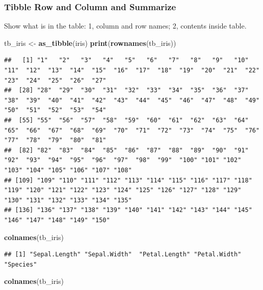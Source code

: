\documentclass[
]{book}
\newenvironment{Shaded}{\begin{snugshade}}{\end{snugshade}}
\newcommand{\KeywordTok}[1]{\textcolor[rgb]{0.13,0.29,0.53}{\textbf{#1}}}
\newcommand{\NormalTok}[1]{#1}
\newcommand{\StringTok}[1]{\textcolor[rgb]{0.31,0.60,0.02}{#1}}
\begin{document}
\hypertarget{tibble-row-and-column-and-summarize}{%
\subsubsection{Tibble Row and Column and Summarize}\label{tibble-row-and-column-and-summarize}}

Show what is in the table: 1, column and row names; 2, contents inside table.

\begin{Shaded}
\begin{Highlighting}[]
\NormalTok{tb\_iris \textless{}{-}}\StringTok{ }\KeywordTok{as\_tibble}\NormalTok{(iris)}
\KeywordTok{print}\NormalTok{(}\KeywordTok{rownames}\NormalTok{(tb\_iris))}
\end{Highlighting}
\end{Shaded}

\begin{verbatim}
##   [1] "1"   "2"   "3"   "4"   "5"   "6"   "7"   "8"   "9"   "10"  "11"  "12"  "13"  "14"  "15"  "16"  "17"  "18"  "19"  "20"  "21"  "22"  "23"  "24"  "25"  "26"  "27" 
##  [28] "28"  "29"  "30"  "31"  "32"  "33"  "34"  "35"  "36"  "37"  "38"  "39"  "40"  "41"  "42"  "43"  "44"  "45"  "46"  "47"  "48"  "49"  "50"  "51"  "52"  "53"  "54" 
##  [55] "55"  "56"  "57"  "58"  "59"  "60"  "61"  "62"  "63"  "64"  "65"  "66"  "67"  "68"  "69"  "70"  "71"  "72"  "73"  "74"  "75"  "76"  "77"  "78"  "79"  "80"  "81" 
##  [82] "82"  "83"  "84"  "85"  "86"  "87"  "88"  "89"  "90"  "91"  "92"  "93"  "94"  "95"  "96"  "97"  "98"  "99"  "100" "101" "102" "103" "104" "105" "106" "107" "108"
## [109] "109" "110" "111" "112" "113" "114" "115" "116" "117" "118" "119" "120" "121" "122" "123" "124" "125" "126" "127" "128" "129" "130" "131" "132" "133" "134" "135"
## [136] "136" "137" "138" "139" "140" "141" "142" "143" "144" "145" "146" "147" "148" "149" "150"
\end{verbatim}

\begin{Shaded}
\begin{Highlighting}[]
\KeywordTok{colnames}\NormalTok{(tb\_iris)}
\end{Highlighting}
\end{Shaded}

\begin{verbatim}
## [1] "Sepal.Length" "Sepal.Width"  "Petal.Length" "Petal.Width"  "Species"
\end{verbatim}

\begin{Shaded}
\begin{Highlighting}[]
\KeywordTok{colnames}\NormalTok{(tb\_iris)}
\end{Highlighting}
\end{Shaded}
\end{document}
